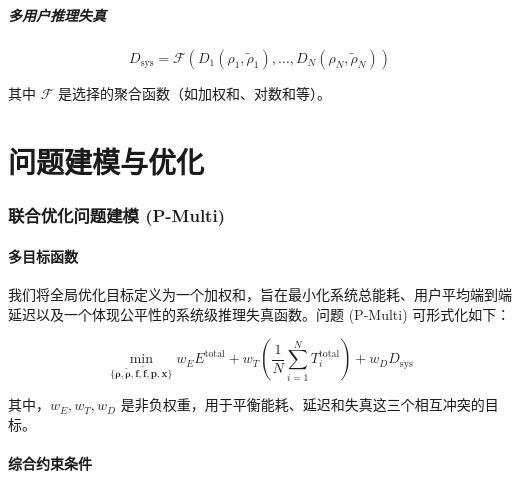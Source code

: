 \documentclass[11pt, a4paper]{article}
\begin{document}
\subsubsection{多用户推理失真}

\begin{equation}
D_{\text{sys}} = \mathcal{F}(D_1(\rho_1, \tilde{\rho}_1), \dots, D_N(\rho_N, \tilde{\rho}_N))
\end{equation}

其中 $\mathcal{F}$ 是选择的聚合函数（如加权和、对数和等）。

\part{问题建模与优化}

\section{联合优化问题建模 (P-Multi)}

\subsection{多目标函数}

我们将全局优化目标定义为一个加权和，旨在最小化系统总能耗、用户平均端到端延迟以及一个体现公平性的系统级推理失真函数。问题 (P-Multi) 可形式化如下：

\begin{equation}
\min_{\{\mathbf{\rho}, \tilde{\mathbf{\rho}}, \mathbf{f}, \tilde{\mathbf{f}}, \mathbf{p}, \mathbf{x}\}} w_E E^{\text{total}} + w_T \left(\frac{1}{N}\sum_{i=1}^N T_i^{\text{total}}\right) + w_D D_{\text{sys}}
\end{equation}

其中，$w_E, w_T, w_D$ 是非负权重，用于平衡能耗、延迟和失真这三个相互冲突的目标。

\subsection{综合约束条件}
\end{document}
